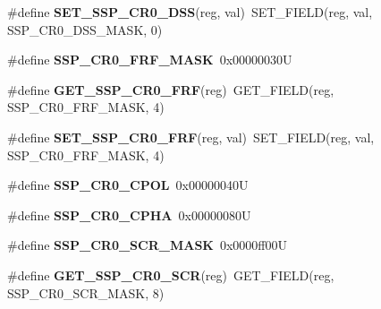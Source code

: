 \begin{DoxyCompactItemize}
\item 
\mbox{\label{group__lpc24xx__regs_ga3ca01ff350a679b8e3f658496793934b}} 
\#define {\bfseries S\+E\+T\+\_\+\+S\+S\+P\+\_\+\+C\+R0\+\_\+\+D\+SS}(reg,  val)~S\+E\+T\+\_\+\+F\+I\+E\+LD(reg, val, S\+S\+P\+\_\+\+C\+R0\+\_\+\+D\+S\+S\+\_\+\+M\+A\+SK, 0)
\item 
\mbox{\label{group__lpc24xx__regs_ga2d1ba64bda87586278e17ec9108f6693}} 
\#define {\bfseries S\+S\+P\+\_\+\+C\+R0\+\_\+\+F\+R\+F\+\_\+\+M\+A\+SK}~0x00000030U
\item 
\mbox{\label{group__lpc24xx__regs_gae316a30c6dd704e0d3049d927045aef7}} 
\#define {\bfseries G\+E\+T\+\_\+\+S\+S\+P\+\_\+\+C\+R0\+\_\+\+F\+RF}(reg)~G\+E\+T\+\_\+\+F\+I\+E\+LD(reg, S\+S\+P\+\_\+\+C\+R0\+\_\+\+F\+R\+F\+\_\+\+M\+A\+SK, 4)
\item 
\mbox{\label{group__lpc24xx__regs_gac21cfae4875c14913ea57b4496ce38c4}} 
\#define {\bfseries S\+E\+T\+\_\+\+S\+S\+P\+\_\+\+C\+R0\+\_\+\+F\+RF}(reg,  val)~S\+E\+T\+\_\+\+F\+I\+E\+LD(reg, val, S\+S\+P\+\_\+\+C\+R0\+\_\+\+F\+R\+F\+\_\+\+M\+A\+SK, 4)
\item 
\mbox{\label{group__lpc24xx__regs_ga413f55cbe945177ada5d1d194b94321f}} 
\#define {\bfseries S\+S\+P\+\_\+\+C\+R0\+\_\+\+C\+P\+OL}~0x00000040U
\item 
\mbox{\label{group__lpc24xx__regs_ga91b1139a826dde19dc25ccb55c4ae2a6}} 
\#define {\bfseries S\+S\+P\+\_\+\+C\+R0\+\_\+\+C\+P\+HA}~0x00000080U
\item 
\mbox{\label{group__lpc24xx__regs_gad208e7dec00a3df3a404d2167bafd0b7}} 
\#define {\bfseries S\+S\+P\+\_\+\+C\+R0\+\_\+\+S\+C\+R\+\_\+\+M\+A\+SK}~0x0000ff00U
\item 
\mbox{\label{group__lpc24xx__regs_ga22c51fc5003bdb0242af06375b8d0559}} 
\#define {\bfseries G\+E\+T\+\_\+\+S\+S\+P\+\_\+\+C\+R0\+\_\+\+S\+CR}(reg)~G\+E\+T\+\_\+\+F\+I\+E\+LD(reg, S\+S\+P\+\_\+\+C\+R0\+\_\+\+S\+C\+R\+\_\+\+M\+A\+SK, 8)
\item 
\mbox{\label{group__lpc24xx__regs_ga8093a47e71ae277ef97657169a5fbcee}} 

\end{DoxyCompactItemize}
